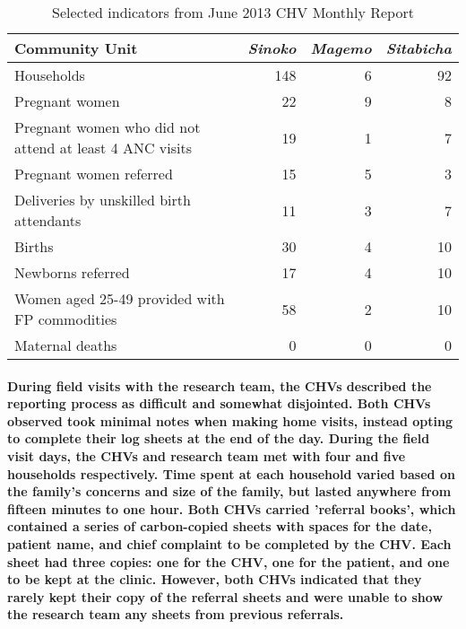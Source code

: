 \begin{table}[htbp]
  \centering
  \caption{Selected indicators from June 2013 CHV Monthly Report}
    \begin{tabular}{lrrr}
    \toprule
    \textbf{Community Unit} & \textit{Sinoko} & \textit{Magemo} & \textit{Sitabicha} \\
    \midrule
    Households & 148   & 6     & 92 \\
    Pregnant women & 22    & 9     & 8 \\
    Pregnant women who did not attend at least 4 ANC visits & 19    & 1     & 7 \\
    Pregnant women referred & 15    & 5     & 3 \\
    Deliveries by unskilled birth attendants & 11    & 3     & 7 \\
    Births & 30    & 4     & 10 \\
    Newborns referred & 17    & 4     & 10 \\
    Women aged 25-49 provided with FP commodities & 58    & 2     & 10 \\
    Maternal deaths & 0     & 0     & 0 \\
    \bottomrule
    \end{tabular}%
  \label{tab:chvreport}%
\end{table}%


\paragraph{During field visits with the research team, the CHVs described the reporting process as difficult and somewhat disjointed. Both CHVs observed took minimal notes when making home visits, instead opting to complete their log sheets at the end of the day. During the field visit days, the CHVs and research team met with four and five households respectively. Time spent at each household varied based on the family's concerns and size of the family, but lasted anywhere from fifteen minutes to one hour. Both CHVs carried 'referral books', which contained a series of carbon-copied sheets with spaces for the date, patient name, and chief complaint to be completed by the CHV. Each sheet had three copies: one for the CHV, one for the patient, and one to be kept at the clinic. However, both CHVs indicated that they rarely kept their copy of the referral sheets and were unable to show the research team any sheets from previous referrals.}

